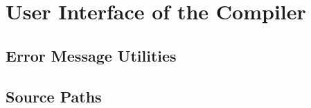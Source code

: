 \chapter{User Interface of the Compiler}

\section{Error Message Utilities}

\section{Source Paths}
\label{source-paths}
